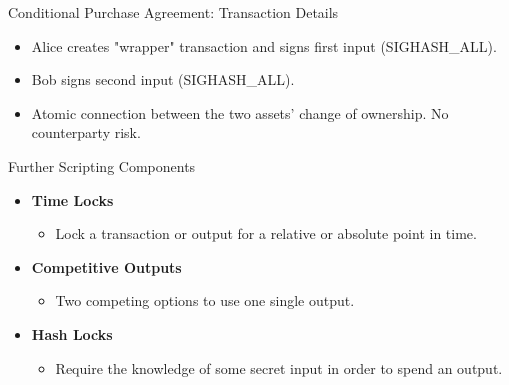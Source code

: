 \documentclass[handout]{beamer}
\begin{document}
\begin{frame}{Conditional Purchase Agreement: Transaction Details}
\begin{figure}
	\end{figure}
	\begin{itemize}
		\item<1 ->Alice creates "wrapper" transaction and signs first input  (SIGHASH\_ALL).
		\item<3 ->Bob signs second input (SIGHASH\_ALL).
		\item<4 ->Atomic connection between the two assets' change of ownership. No counterparty risk.
	\end{itemize}
\end{frame}


\begin{frame}{Further Scripting Components}
	\begin{itemize}
		\item<1-> \textbf{Time Locks}
		\begin{itemize}
			\item<1-> Lock a transaction or output for a relative or absolute point in time.
		\end{itemize}
		\vspace{0.25cm}
		\item<2-> \textbf{Competitive Outputs}
		\begin{itemize}
			\item<2-> Two competing options to use one single output.
		\end{itemize}
		\vspace{0.25cm}
		\item<3-> \textbf{Hash Locks}
		\begin{itemize}
			\item<3-> Require the knowledge of some secret input in order to spend an output.
		\end{itemize}
	\end{itemize}
\end{frame}
\end{document}
